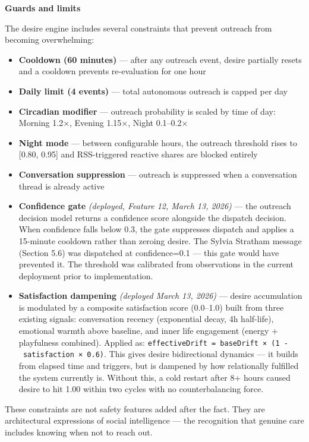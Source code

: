 \textbf{Guards and limits}

The desire engine includes several constraints that prevent outreach
from becoming overwhelming:

\begin{itemize}
\tightlist
\item
  \textbf{Cooldown (60 minutes)} --- after any outreach event, desire
  partially resets and a cooldown prevents re-evaluation for one hour
\item
  \textbf{Daily limit (4 events)} --- total autonomous outreach is
  capped per day
\item
  \textbf{Circadian modifier} --- outreach probability is scaled by time
  of day: Morning 1.2×, Evening 1.15×, Night 0.1--0.2×
\item
  \textbf{Night mode} --- between configurable hours, the outreach
  threshold rises to {[}0.80, 0.95{]} and RSS-triggered reactive shares
  are blocked entirely
\item
  \textbf{Conversation suppression} --- outreach is suppressed when a
  conversation thread is already active
\item
  \textbf{Confidence gate} \emph{(deployed, Feature 12, March 13, 2026)}
  --- the outreach decision model returns a confidence score alongside
  the dispatch decision. When confidence falls below 0.3, the gate
  suppresses dispatch and applies a 15-minute cooldown rather than
  zeroing desire. The Sylvia Stratham message (Section 5.6) was
  dispatched at confidence=0.1 --- this gate would have prevented it.
  The threshold was calibrated from observations in the current
  deployment prior to implementation.
\item
  \textbf{Satisfaction dampening} \emph{(deployed March 13, 2026)} ---
  desire accumulation is modulated by a composite satisfaction score
  (0.0--1.0) built from three existing signals: conversation recency
  (exponential decay, 4h half-life), emotional warmth above baseline,
  and inner life engagement (energy + playfulness combined). Applied as:
  \texttt{effectiveDrift\ =\ baseDrift\ ×\ (1\ -\ satisfaction\ ×\ 0.6)}.
  This gives desire bidirectional dynamics --- it builds from elapsed
  time and triggers, but is dampened by how relationally fulfilled the
  system currently is. Without this, a cold restart after 8+ hours
  caused desire to hit 1.00 within two cycles with no counterbalancing
  force.
\end{itemize}

These constraints are not safety features added after the fact. They are
architectural expressions of social intelligence --- the recognition
that genuine care includes knowing when not to reach out.

